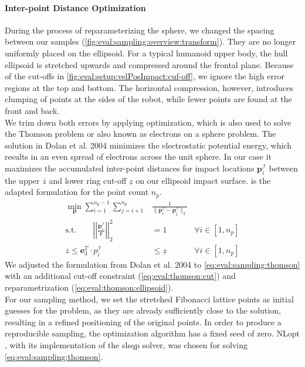 \paragraph{Inter-point Distance Optimization} \label{sec:eval:sampling:thomson}
During the process of reparameterizing the sphere, we changed the spacing between our samples (\cref{fig:eval:sampling:overview:transform}).
They are no longer uniformly placed on the ellipsoid.
For a typical humanoid upper body, the hull ellipsoid is stretched upwards and compressed around the frontal plane.
Because of the cut-offs in \cref{fig:eval:setup:velPosImpact:cuf-off}, we ignore the high error regions at the top and bottom.
The horizontal compression, however, introduces clumping of points at the sides of the robot, while fewer points are found at the front and back.
\\
We trim down both errors by applying optimization, which is also used to solve the Thomson problem \cite{thomson_1904} or also known as electrons on a sphere problem.
The solution in Dolan et al. 2004 \cite{dolan_2004} minimizes the electrostatic potential energy, which results in an even spread of electrons across the unit sphere.
In our case it maximizes the accumulated inter-point distances for impact locations $\bm p_i^\mathcal I$ between the upper $\overline z$ and lower ring cut-off $\underline z$ on our ellipsoid impact surface.
 is the adapted formulation for the point count $n_p$.
\begin{subequations}
\label{eq:eval:sampling:thomson}
  \begin{align}
    \min_{\bm p} \sum^{n_p-1}_{i=1} \sum^{n_p}_{j=i+1} & \frac{1}{\|\bm p_i^{\mathcal I}- \bm p_j^{\mathcal I}\|_2} & \label{eq:eval:thomson:obj} \\
  \text{s.t.} \qquad \left|\left|\frac{\bm p_i^\mathcal I}{\bm r}\right|\right|_2^2 & = 1 & \forall i \in \left[ 1, n_p \right] \label{eq:eval:thomson:ellipsoid} \\
\overline z \leq \bm e_3^T \cdot p_i^{\mathcal I} & \leq \underline z &  \forall i \in \left[ 1, n_p \right] \label{eq:eval:thomson:cut}
  \end{align}
\end{subequations}
We adjusted the formulation from Dolan et al. 2004 \cite{dolan_2004} to \cref{eq:eval:sampling:thomson} with an additional cut-off constraint (\cref{eq:eval:thomson:cut}) and reparametrization (\cref{eq:eval:thomson:ellipsoid}). \\
For our sampling method, we set the stretched Fibonacci lattice points as initial guesses for the problem, as they are already sufficiently close to the solution, resulting in a refined positioning of the original points.
In order to produce a reproducible sampling, the optimization algorithm has a fixed seed of zero.
NLopt \cite{NLopt}, with its implementation of the \acrshort{slsqp} \cite{kraft_1994} solver, was chosen for solving \cref{eq:eval:sampling:thomson}.

